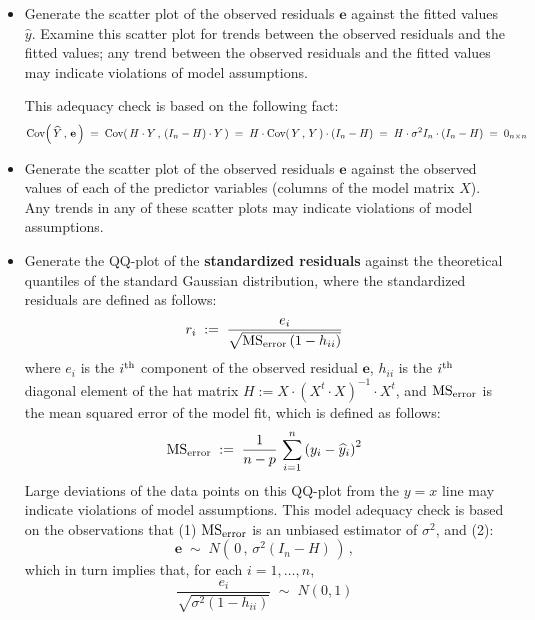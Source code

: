 \documentclass{article}
\begin{document}
\begin{itemize}
\item 	Generate the scatter plot of the observed residuals $\mathbf{e}$ against the fitted values
		$\widehat{y}$.
		Examine this scatter plot for trends between the observed residuals and the fitted values;
		any trend between the observed residuals and the fitted values may indicate violations
		of model assumptions.

		This adequacy check is based on the following fact:
		\begin{equation*}
		\textnormal{Cov}\!\left(\,\widehat{Y}\,,\,\mathbf{e}\,\right)
		\; = \; \textnormal{Cov}\!\left(\,H\cdot Y\,,\,\left(I_{n}-H\right)\cdot Y\,\right)
		\; = \; H\cdot\textnormal{Cov}\!\left(\,Y\,,\,Y\,\right)\cdot \left(I_{n}-H\right)
		\; = \; H\cdot \sigma^{2} I_{n} \cdot \left(I_{n}-H\right)
		\; = \; 0_{n \times n}
		\end{equation*}

\item 	Generate the scatter plot of the observed residuals $\mathbf{e}$ against the observed values of
		each of the predictor variables (columns of the model matrix $X$). Any trends in any of these
		scatter plots may indicate violations of model assumptions.

\item 	Generate the QQ-plot of the \textbf{standardized residuals} against the theoretical quantiles
		of the standard Gaussian distribution, where the standardized residuals are defined as follows:
		\begin{equation*}
		r_{i} \; := \; \dfrac{e_{i}}{\sqrt{\textnormal{MS}_{\textnormal{error}}\left(1 - h_{ii}\right)}}
		\end{equation*}
		where $e_{i}$ is the $i^{\textnormal{th}}$ component of the observed residual $\mathbf{e}$,
		$h_{ii}$ is the $i^{\textnormal{th}}$ diagonal element of the hat matrix
		$H := X \cdot \left(X^{t}\cdot X\right)^{-1}\cdot X^{t}$, and
		$\textnormal{MS}_{\textnormal{error}}$ is the mean squared error of the model fit, which is
		defined as follows:
		\begin{equation*}
		\textnormal{MS}_{\textnormal{error}}
		\; := \;
		\dfrac{1}{n - p}\,\sum_{i=1}^{n}\left(y_{i} - \widehat{y}_{i}\right)^{2}
		\end{equation*}
		Large deviations of the data points on this QQ-plot from the $y = x$ line may indicate
		violations of model assumptions.
		This model adequacy check is based on the observations that (1)
		$\textnormal{MS}_{\textnormal{error}}$ is an unbiased estimator of $\sigma^{2}$, and (2):
		\begin{equation*}
		\mathbf{e} \; \sim \; N\!\left(\,0\,,\,\sigma^{2}\left(I_{n}-H\right)\,\right)\,,
		\end{equation*}
		which in turn implies that, for each $i = 1, \ldots, n$,
		\begin{equation*}
		\dfrac{e_{i}}{\sqrt{\sigma^{2}\left(1 - h_{ii}\right)}}
		\; \sim \;
		N(0,1)
		\end{equation*}
\end{itemize}
\end{document}
